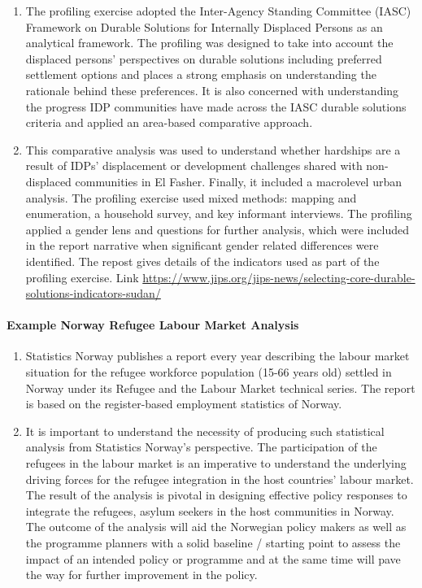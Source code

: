 \documentclass[
]{article}
\begin{document}
\begin{enumerate}
\def\labelenumi{\arabic{enumi}.}
\setcounter{enumi}{446}
\item
  The profiling exercise adopted the Inter-Agency Standing Committee
  (IASC) Framework on Durable Solutions for Internally Displaced
  Persons as an analytical framework. The profiling was designed to
  take into account the displaced persons' perspectives on durable
  solutions including preferred settlement options and places a strong
  emphasis on understanding the rationale behind these preferences. It
  is also concerned with understanding the progress IDP communities
  have made across the IASC durable solutions criteria and applied an
  area-based comparative approach.
\item
  This comparative analysis was used to understand whether hardships
  are a result of IDPs' displacement or development challenges shared
  with non-displaced communities in El Fasher. Finally, it included a
  macrolevel urban analysis. The profiling exercise used mixed
  methods: mapping and enumeration, a household survey, and key
  informant interviews. The profiling applied a gender lens and
  questions for further analysis, which were included in the report
  narrative when significant gender related differences were
  identified. The repost gives details of the indicators used as part
  of the profiling exercise. Link
  \url{https://www.jips.org/jips-news/selecting-core-durable-solutions-indicators-sudan/}
\end{enumerate}

\hypertarget{example-norway-refugee-labour-market-analysis}{%
\paragraph{Example Norway Refugee Labour Market Analysis}\label{example-norway-refugee-labour-market-analysis}}

\begin{enumerate}
\def\labelenumi{\arabic{enumi}.}
\setcounter{enumi}{448}
\item
  Statistics Norway publishes a report every year describing the
  labour market situation for the refugee workforce population (15-66
  years old) settled in Norway under its Refugee and the Labour Market
  technical series. The report is based on the register-based
  employment statistics of Norway.
\item
  It is important to understand the necessity of producing such
  statistical analysis from Statistics Norway's perspective. The
  participation of the refugees in the labour market is an imperative
  to understand the underlying driving forces for the refugee
  integration in the host countries' labour market. The result of the
  analysis is pivotal in designing effective policy responses to
  integrate the refugees, asylum seekers in the host communities in
  Norway. The outcome of the analysis will aid the Norwegian policy
  makers as well as the programme planners with a solid baseline /
  starting point to assess the impact of an intended policy or
  programme and at the same time will pave the way for further
  improvement in the policy.
\end{enumerate}
\end{document}
